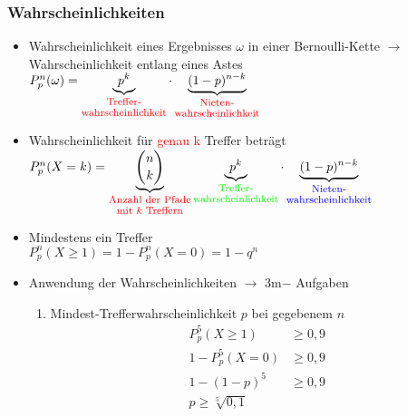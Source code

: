 \documentclass[a4paper,twocolumn,10pt]{onepgnote1}
\begin{document}
\subsubsection{Wahrscheinlichkeiten}
\begin{itemize}
    \item Wahrscheinlichkeit eines Ergebnisses $\omega$ in einer Bernoulli-Kette $\longrightarrow$ Wahrscheinlichkeit entlang eines Astes\\ $P_p^n(\omega) = \underbrace{p^k}_{\shortstack{\textcolor{red}{\footnotesize{Treffer-}}\\ \textcolor{red}{\footnotesize{wahrscheinlichkeit}}}} \cdot
\underbrace{(1 - p)^{n - k}}_{\shortstack{\footnotesize{\textcolor{red}{Nieten-}}\\ \footnotesize{\textcolor{red}{wahrscheinlichkeit}}}}$\\
    \item Wahrscheinlichkeit für \textcolor{red}{genau k} Treffer beträgt\\ $P_p^n(X = k) = \underbrace{\binom{n}{k}}_{\shortstack{\textcolor{red}{\footnotesize{Anzahl der Pfade}}\\ \textcolor{red}{\footnotesize{mit $k$ Treffern}}}} \underbrace{p^k}_{\shortstack{\textcolor{green}{\footnotesize{Treffer-}}\\ \textcolor{green}{\footnotesize{wahrscheinlichkeit}}}} \cdot
\underbrace{(1 - p)^{n - k}}_{\shortstack{\footnotesize{\textcolor{blue}{Nieten-}}\\ \footnotesize{\textcolor{blue}{wahrscheinlichkeit}}}}$\\
    \item Mindestens ein Treffer\\ $P_p^n(X\geq 1) = 1- P_p^n(X=0) =1-q^n$\\
    \item Anwendung der Wahrscheinlichkeiten $\longrightarrow$ 3m$-$ Aufgaben\\
\begin{enumerate}
    \item Mindest-Trefferwahrscheinlichkeit $p$ bei gegebenem $n$
    \begin{equation*}
        \begin{split}
            P^5_p(X\geq 1) &\geq 0,9\\
            1-P^5_p(X=0)&\geq 0,9\\
            1-(1-p)^5 &\geq 0,9\\
            p\geq \sqrt[5]{0,1}
        \end{split}
    \end{equation*}

\end{enumerate}
\end{itemize}
\end{document}
